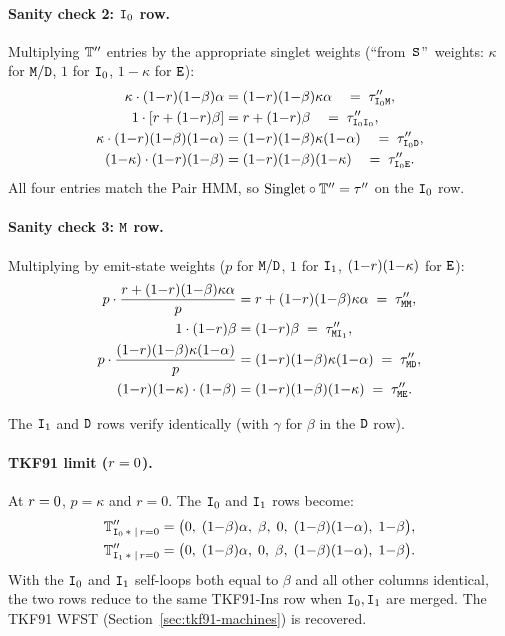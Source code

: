 \paragraph{Sanity check 2: ${\tt I}_0$ row.}
Multiplying $\mathbb{T}''$ entries by the appropriate singlet weights
(``from~${\tt S}$''~weights: $\kappa$ for ${\tt M}/{\tt D}$, $1$ for ${\tt I}_0$,
$1{-}\kappa$ for ${\tt E}$):
\begin{align*}
\kappa\cdot(1{-}r)(1{-}\beta)\alpha &= (1{-}r)(1{-}\beta)\kappa\alpha
\quad =\;\tau''_{{\tt I}_0{\tt M}},\\
1\cdot[r+(1{-}r)\beta] &= r+(1{-}r)\beta
\quad =\;\tau''_{{\tt I}_0{\tt I}_0},\\
\kappa\cdot(1{-}r)(1{-}\beta)(1{-}\alpha) &= (1{-}r)(1{-}\beta)\kappa(1{-}\alpha)
\quad =\;\tau''_{{\tt I}_0{\tt D}},\\
(1{-}\kappa)\cdot(1{-}r)(1{-}\beta) &= (1{-}r)(1{-}\beta)(1{-}\kappa)
\quad =\;\tau''_{{\tt I}_0{\tt E}}.
\end{align*}
All four entries match the Pair HMM, so $\text{Singlet}\circ\mathbb{T}''=
\tau''$ on the ${\tt I}_0$ row.

\paragraph{Sanity check 3: ${\tt M}$ row.}
Multiplying by emit-state weights ($p$ for ${\tt M}/{\tt D}$, $1$ for
${\tt I}_1$, $(1{-}r)(1{-}\kappa)$ for ${\tt E}$):
\begin{align*}
p\cdot\frac{r+(1{-}r)(1{-}\beta)\kappa\alpha}{p}
   &= r+(1{-}r)(1{-}\beta)\kappa\alpha
   \;=\;\tau''_{{\tt M}{\tt M}},\\
1\cdot(1{-}r)\beta &= (1{-}r)\beta
   \;=\;\tau''_{{\tt M}{\tt I}_1},\\
p\cdot\frac{(1{-}r)(1{-}\beta)\kappa(1{-}\alpha)}{p}
   &= (1{-}r)(1{-}\beta)\kappa(1{-}\alpha)
   \;=\;\tau''_{{\tt M}{\tt D}},\\
(1{-}r)(1{-}\kappa)\cdot(1{-}\beta) &= (1{-}r)(1{-}\beta)(1{-}\kappa)
   \;=\;\tau''_{{\tt M}{\tt E}}.
\end{align*}

The ${\tt I}_1$ and ${\tt D}$ rows verify identically (with $\gamma$ for
$\beta$ in the ${\tt D}$ row).

\paragraph{TKF91 limit ($r=0$).}
At $r=0$, $p=\kappa$ and $r=0$.  The ${\tt I}_0$ and ${\tt I}_1$ rows
become:
\begin{align*}
\mathbb{T}''_{{\tt I}_0\,*\;|\,r=0}
  &= \bigl(0,\;(1{-}\beta)\alpha,\;\beta,\;0,\;(1{-}\beta)(1{-}\alpha),\;1{-}\beta\bigr),\\
\mathbb{T}''_{{\tt I}_1\,*\;|\,r=0}
  &= \bigl(0,\;(1{-}\beta)\alpha,\;0,\;\beta,\;(1{-}\beta)(1{-}\alpha),\;1{-}\beta\bigr).
\end{align*}
With the ${\tt I}_0$ and ${\tt I}_1$ self-loops both equal to $\beta$ and
all other columns identical, the two rows reduce to the same
TKF91-Ins row when ${\tt I}_0,{\tt I}_1$ are merged.  The TKF91 WFST
(Section~\ref{sec:tkf91-machines}) is recovered.

